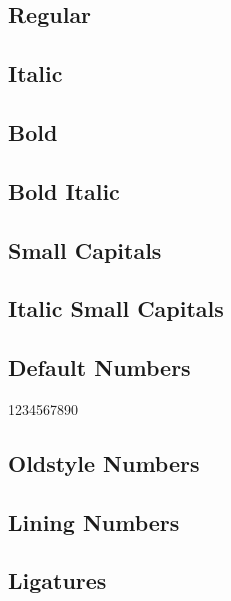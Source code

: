 \documentclass{article}
\begin{document}
\subsection*{Regular}
\lipsum[1]

\subsection*{Italic}
\textit{\lipsum[2]}

\subsection*{Bold}

\textbf{\lipsum[3]}



\subsection*{Bold Italic}

\textbf{\textit{\lipsum[4]}}

\subsection*{Small Capitals}

\textsc{\lipsum[1]}

\subsection*{Italic Small Capitals}

\textsc{\textit{\lipsum[2]}}

\subsection*{Default Numbers}

1234567890

\subsection*{Oldstyle Numbers}


\subsection*{Lining Numbers}


\subsection*{Ligatures}
\end{document}
